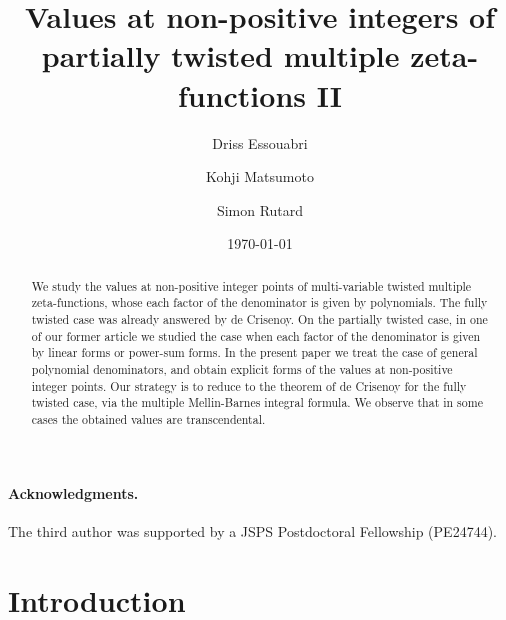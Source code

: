 \documentclass[a4paper,12pt]{article}
\theoremstyle{definition}
\numberwithin{equation}{section}
\begin{document}
\title{Values at non-positive integers of partially twisted multiple zeta-functions II}
\author{Driss Essouabri \and Kohji Matsumoto \and Simon Rutard}
\date{\today}
\maketitle
\begin{abstract}
We study the values at non-positive integer points of multi-variable
twisted multiple zeta-functions, whose each factor of the denominator is given by polynomials.    The fully twisted case was
already answered by de Crisenoy.    On the partially twisted case, 
in one of our former article we studied the case when each factor of
the denominator is given by linear forms or power-sum forms.
In the present paper we treat the case of general polynomial
denominators, and obtain explicit forms of the values at non-positive integer points.    Our strategy is to reduce to the theorem of de Crisenoy for the fully twisted case, via the multiple Mellin-Barnes integral formula.     We observe that in some cases the obtained values are transcendental.
\end{abstract}

\paragraph{\textbf{Acknowledgments.}}
The third author was supported by a JSPS Postdoctoral Fellowship (PE24744).

\tableofcontents

\section{Introduction}\label{intro}
\end{document}

